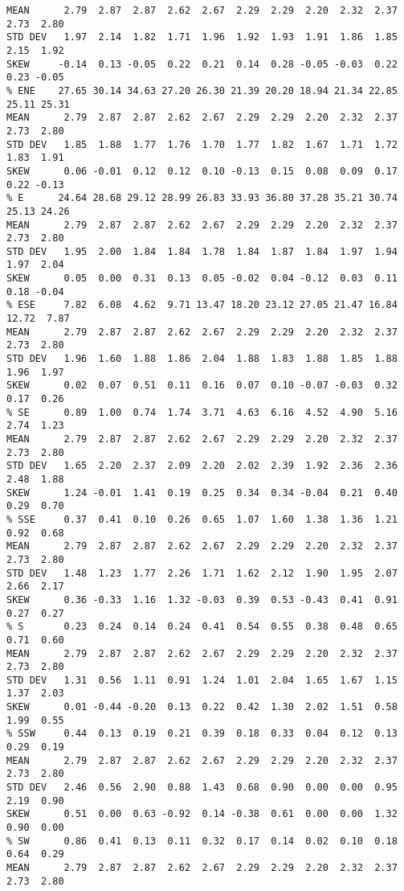 \begin{verbatim}
MEAN      2.79  2.87  2.87  2.62  2.67  2.29  2.29  2.20  2.32  2.37  2.73  2.80
STD DEV   1.97  2.14  1.82  1.71  1.96  1.92  1.93  1.91  1.86  1.85  2.15  1.92
SKEW     -0.14  0.13 -0.05  0.22  0.21  0.14  0.28 -0.05 -0.03  0.22  0.23 -0.05
% ENE    27.65 30.14 34.63 27.20 26.30 21.39 20.20 18.94 21.34 22.85 25.11 25.31
MEAN      2.79  2.87  2.87  2.62  2.67  2.29  2.29  2.20  2.32  2.37  2.73  2.80
STD DEV   1.85  1.88  1.77  1.76  1.70  1.77  1.82  1.67  1.71  1.72  1.83  1.91
SKEW      0.06 -0.01  0.12  0.12  0.10 -0.13  0.15  0.08  0.09  0.17  0.22 -0.13
% E      24.64 28.68 29.12 28.99 26.83 33.93 36.80 37.28 35.21 30.74 25.13 24.26
MEAN      2.79  2.87  2.87  2.62  2.67  2.29  2.29  2.20  2.32  2.37  2.73  2.80
STD DEV   1.95  2.00  1.84  1.84  1.78  1.84  1.87  1.84  1.97  1.94  1.97  2.04
SKEW      0.05  0.00  0.31  0.13  0.05 -0.02  0.04 -0.12  0.03  0.11  0.18 -0.04
% ESE     7.82  6.08  4.62  9.71 13.47 18.20 23.12 27.05 21.47 16.84 12.72  7.87
MEAN      2.79  2.87  2.87  2.62  2.67  2.29  2.29  2.20  2.32  2.37  2.73  2.80
STD DEV   1.96  1.60  1.88  1.86  2.04  1.88  1.83  1.88  1.85  1.88  1.96  1.97
SKEW      0.02  0.07  0.51  0.11  0.16  0.07  0.10 -0.07 -0.03  0.32  0.17  0.26
% SE      0.89  1.00  0.74  1.74  3.71  4.63  6.16  4.52  4.90  5.16  2.74  1.23
MEAN      2.79  2.87  2.87  2.62  2.67  2.29  2.29  2.20  2.32  2.37  2.73  2.80
STD DEV   1.65  2.20  2.37  2.09  2.20  2.02  2.39  1.92  2.36  2.36  2.48  1.88
SKEW      1.24 -0.01  1.41  0.19  0.25  0.34  0.34 -0.04  0.21  0.40  0.29  0.70
% SSE     0.37  0.41  0.10  0.26  0.65  1.07  1.60  1.38  1.36  1.21  0.92  0.68
MEAN      2.79  2.87  2.87  2.62  2.67  2.29  2.29  2.20  2.32  2.37  2.73  2.80
STD DEV   1.48  1.23  1.77  2.26  1.71  1.62  2.12  1.90  1.95  2.07  2.66  2.17
SKEW      0.36 -0.33  1.16  1.32 -0.03  0.39  0.53 -0.43  0.41  0.91  0.27  0.27
% S       0.23  0.24  0.14  0.24  0.41  0.54  0.55  0.38  0.48  0.65  0.71  0.60
MEAN      2.79  2.87  2.87  2.62  2.67  2.29  2.29  2.20  2.32  2.37  2.73  2.80
STD DEV   1.31  0.56  1.11  0.91  1.24  1.01  2.04  1.65  1.67  1.15  1.37  2.03
SKEW      0.01 -0.44 -0.20  0.13  0.22  0.42  1.30  2.02  1.51  0.58  1.99  0.55
% SSW     0.44  0.13  0.19  0.21  0.39  0.18  0.33  0.04  0.12  0.13  0.29  0.19
MEAN      2.79  2.87  2.87  2.62  2.67  2.29  2.29  2.20  2.32  2.37  2.73  2.80
STD DEV   2.46  0.56  2.90  0.88  1.43  0.68  0.90  0.00  0.00  0.95  2.19  0.90
SKEW      0.51  0.00  0.63 -0.92  0.14 -0.38  0.61  0.00  0.00  1.32  0.90  0.00
% SW      0.86  0.41  0.13  0.11  0.32  0.17  0.14  0.02  0.10  0.18  0.64  0.29
MEAN      2.79  2.87  2.87  2.62  2.67  2.29  2.29  2.20  2.32  2.37  2.73  2.80

\end{verbatim}
